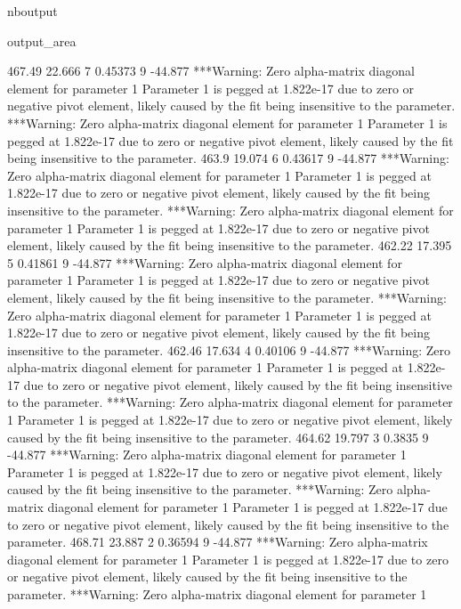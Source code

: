 \documentclass[letterpaper,10pt,english]{sphinxmanual}
\begin{document}
\begin{sphinxuseclass}{nboutput}
{\begin{sphinxuseclass}{output_area}
\begin{sphinxuseclass}{}
\begin{sphinxVerbatim}[commandchars=\\\{\}]
          467.49      22.666    7     0.45373    9     -44.877
***Warning: Zero alpha-matrix diagonal element for parameter 1
 Parameter 1 is pegged at 1.822e-17 due to zero or negative pivot element, likely
 caused by the fit being insensitive to the parameter.
***Warning: Zero alpha-matrix diagonal element for parameter 1
 Parameter 1 is pegged at 1.822e-17 due to zero or negative pivot element, likely
 caused by the fit being insensitive to the parameter.
           463.9      19.074    6     0.43617    9     -44.877
***Warning: Zero alpha-matrix diagonal element for parameter 1
 Parameter 1 is pegged at 1.822e-17 due to zero or negative pivot element, likely
 caused by the fit being insensitive to the parameter.
***Warning: Zero alpha-matrix diagonal element for parameter 1
 Parameter 1 is pegged at 1.822e-17 due to zero or negative pivot element, likely
 caused by the fit being insensitive to the parameter.
          462.22      17.395    5     0.41861    9     -44.877
***Warning: Zero alpha-matrix diagonal element for parameter 1
 Parameter 1 is pegged at 1.822e-17 due to zero or negative pivot element, likely
 caused by the fit being insensitive to the parameter.
***Warning: Zero alpha-matrix diagonal element for parameter 1
 Parameter 1 is pegged at 1.822e-17 due to zero or negative pivot element, likely
 caused by the fit being insensitive to the parameter.
          462.46      17.634    4     0.40106    9     -44.877
***Warning: Zero alpha-matrix diagonal element for parameter 1
 Parameter 1 is pegged at 1.822e-17 due to zero or negative pivot element, likely
 caused by the fit being insensitive to the parameter.
***Warning: Zero alpha-matrix diagonal element for parameter 1
 Parameter 1 is pegged at 1.822e-17 due to zero or negative pivot element, likely
 caused by the fit being insensitive to the parameter.
          464.62      19.797    3      0.3835    9     -44.877
***Warning: Zero alpha-matrix diagonal element for parameter 1
 Parameter 1 is pegged at 1.822e-17 due to zero or negative pivot element, likely
 caused by the fit being insensitive to the parameter.
***Warning: Zero alpha-matrix diagonal element for parameter 1
 Parameter 1 is pegged at 1.822e-17 due to zero or negative pivot element, likely
 caused by the fit being insensitive to the parameter.
          468.71      23.887    2     0.36594    9     -44.877
***Warning: Zero alpha-matrix diagonal element for parameter 1
 Parameter 1 is pegged at 1.822e-17 due to zero or negative pivot element, likely
 caused by the fit being insensitive to the parameter.
***Warning: Zero alpha-matrix diagonal element for parameter 1

\end{sphinxVerbatim}
\end{sphinxuseclass}
\end{sphinxuseclass}}
\end{sphinxuseclass}
\end{document}
